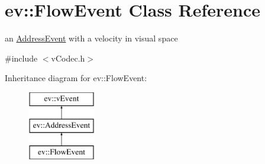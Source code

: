 \hypertarget{classev_1_1FlowEvent}{}\section{ev\+:\+:Flow\+Event Class Reference}
\label{classev_1_1FlowEvent}


an \hyperlink{classev_1_1AddressEvent}{Address\+Event} with a velocity in visual space  




{\ttfamily \#include $<$v\+Codec.\+h$>$}

Inheritance diagram for ev\+:\+:Flow\+Event\+:\begin{figure}[H]
\begin{center}
\leavevmode
\includegraphics[height=3.000000cm]{classev_1_1FlowEvent}
\end{center}
\end{figure}
